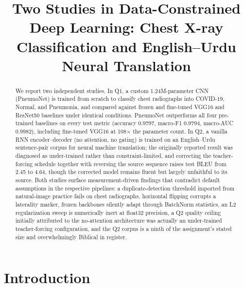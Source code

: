 \documentclass[conference]{IEEEtran}
\begin{document}
\title{Two Studies in Data-Constrained Deep Learning: Chest X-ray Classification and English--Urdu Neural Translation}

\author{
}

\maketitle

\begin{abstract}
We report two independent studies. In Q1, a custom 1.24M-parameter CNN
(PneumoNet) is trained from scratch to classify chest radiographs into
COVID-19, Normal, and Pneumonia, and compared against frozen and
fine-tuned VGG16 and ResNet50 baselines under identical conditions.
PneumoNet outperforms all four pre-trained baselines on every test metric
(accuracy 0.9797, macro-F1 0.9794, macro-AUC 0.9982), including
fine-tuned VGG16 at 108$\times$ the parameter count. In Q2, a vanilla
RNN encoder--decoder (no attention, no gating) is trained on an
English--Urdu sentence-pair corpus for neural machine translation; the
originally reported result was diagnosed as under-trained rather than
constraint-limited, and correcting the teacher-forcing schedule
together with reversing the source sequence raises test BLEU from 2.45
to 4.64, though the corrected model remains fluent but largely
unfaithful to its source. Both studies surface measurement-driven
findings that contradict default assumptions in the respective
pipelines: a duplicate-detection threshold imported from natural-image
practice fails on chest radiographs, horizontal flipping corrupts a
laterality marker, frozen backbones silently adapt through BatchNorm
statistics, an L2 regularization sweep is numerically inert at float32
precision, a Q2 quality ceiling initially attributed to the
no-attention architecture was actually an under-trained
teacher-forcing configuration, and the Q2 corpus is a ninth of the
assignment's stated size and overwhelmingly Biblical in register.
\end{abstract}

\section{Introduction}
\end{document}
